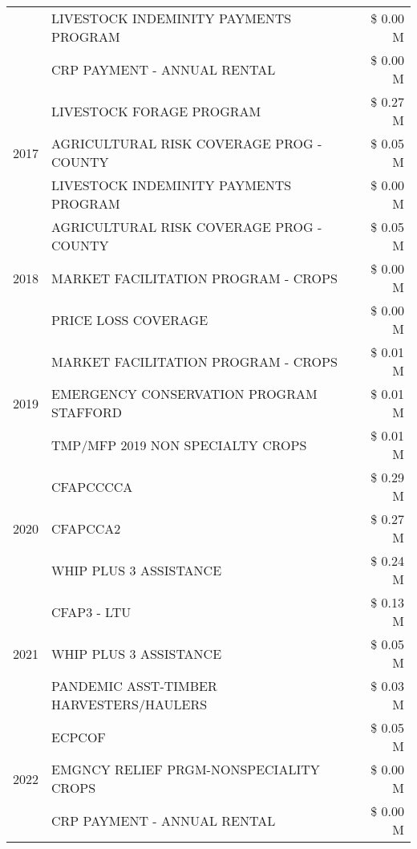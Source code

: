 \begin{tabular}{llr}
 & LIVESTOCK INDEMINITY PAYMENTS PROGRAM & \$ 0.00 M \\
 & CRP PAYMENT - ANNUAL RENTAL & \$ 0.00 M \\
\cline{1-3}
\multirow[t]{3}{*}{2017} & LIVESTOCK FORAGE PROGRAM & \$ 0.27 M \\
 & AGRICULTURAL RISK COVERAGE PROG - COUNTY & \$ 0.05 M \\
 & LIVESTOCK INDEMINITY PAYMENTS PROGRAM & \$ 0.00 M \\
\cline{1-3}
\multirow[t]{3}{*}{2018} & AGRICULTURAL RISK COVERAGE PROG - COUNTY & \$ 0.05 M \\
 & MARKET FACILITATION PROGRAM - CROPS & \$ 0.00 M \\
 & PRICE LOSS COVERAGE & \$ 0.00 M \\
\cline{1-3}
\multirow[t]{3}{*}{2019} & MARKET FACILITATION PROGRAM - CROPS & \$ 0.01 M \\
 & EMERGENCY CONSERVATION PROGRAM STAFFORD & \$ 0.01 M \\
 & TMP/MFP 2019 NON SPECIALTY CROPS & \$ 0.01 M \\
\cline{1-3}
\multirow[t]{3}{*}{2020} & CFAPCCCCA & \$ 0.29 M \\
 & CFAPCCA2 & \$ 0.27 M \\
 & WHIP PLUS 3 ASSISTANCE & \$ 0.24 M \\
\cline{1-3}
\multirow[t]{3}{*}{2021} & CFAP3 - LTU & \$ 0.13 M \\
 & WHIP PLUS 3 ASSISTANCE & \$ 0.05 M \\
 & PANDEMIC ASST-TIMBER HARVESTERS/HAULERS & \$ 0.03 M \\
\cline{1-3}
\multirow[t]{3}{*}{2022} & ECPCOF & \$ 0.05 M \\
 & EMGNCY RELIEF PRGM-NONSPECIALITY CROPS & \$ 0.00 M \\
 & CRP PAYMENT - ANNUAL RENTAL & \$ 0.00 M \\
\cline{1-3}
\bottomrule
\end{tabular}
